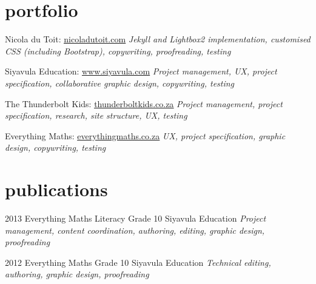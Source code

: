 \documentclass[]{friggeri-cv} %
\begin{document}
\section{portfolio}
\begin{sitelist}
\site
{}
{Nicola du Toit: \href{http://www.nicoladutoit.com/ux-portfolio}{\underline{nicoladutoit.com}}}
{}
{\emph{Jekyll and Lightbox2 implementation, customised CSS (including Bootstrap), copywriting, proofreading, testing}}

\site
{}
{Siyavula Education: \href{http://www.siyavula.com}{\underline{www.siyavula.com}}}
{}
{\emph{Project management, UX, project specification, collaborative graphic design, copywriting, testing}}


\site
{}
{The Thunderbolt Kids: \href{http://thunderboltkids.co.za}{\underline{thunderboltkids.co.za}}}
{}
{\emph{Project management, project specification, research, site structure, UX, testing}}

\site
{}
{Everything Maths: \href{http://www.everythingmaths.co.za}{\underline{everythingmaths.co.za}}}
{}
{\emph{UX, project specification, graphic design, copywriting, testing}}

\end{sitelist}

\section{publications}
\begin{entrylist}
\entry
{2013}
{Everything Maths Literacy Grade 10}
{Siyavula Education}
{\emph{Project management, content coordination, authoring, editing, graphic design, proofreading}}

\entry
{2012}
{Everything Maths Grade 10}
{Siyavula Education}
{\emph{Technical editing, authoring, graphic design, proofreading}}

\end{entrylist}
\end{document}
